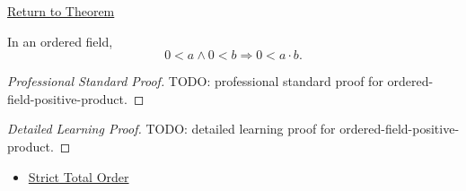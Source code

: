 \newpage
{}
\label{prf:ordered-field-positive-product}

\begin{remark*}[Return]
\hyperref[prop:product-of-positives-is-positive-q]{Return to Theorem}
\end{remark*}

\begin{proposition*}
In an ordered field,
\[
0<a\land0<b
\Longrightarrow
0<a\cdot b.
\]
\end{proposition*}

\begin{proof}[Professional Standard Proof]
\LRAProofBodyStart
TODO: professional standard proof for ordered-field-positive-product.
\end{proof}

\begin{proof}[Detailed Learning Proof]
\LRAProofBodyStart
TODO: detailed learning proof for ordered-field-positive-product.
\end{proof}

\begin{remark*}
\end{remark*}

\begin{dependencies}
\begin{itemize}
  \item \hyperref[def:strict-total-order]{Strict Total Order}
\end{itemize}
\end{dependencies}

\clearpage
